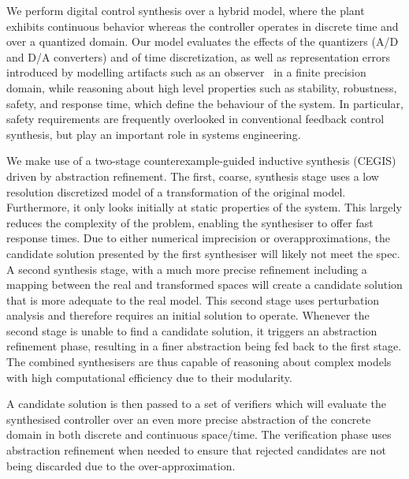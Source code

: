 \documentclass[sigconf]{llncs}
\begin{document}
We perform digital control synthesis over a hybrid model, where the plant
exhibits continuous behavior whereas the controller operates in discrete
time and over a quantized domain.  Our model evaluates the effects of the
quantizers (A/D and D/A converters) and of time discretization, as well as
representation errors introduced by modelling artifacts such as an
observer~\cite{astrom1997computer} in a finite precision domain, while
reasoning about high level properties such as stability, robustness, safety,
and response time, which define the behaviour of the system.  In particular,
safety requirements are frequently overlooked in conventional feedback
control synthesis, but play an important role in systems engineering.


We make use of a two-stage counterexample-guided inductive
synthesis (CEGIS) driven by abstraction refinement.
The first, coarse, synthesis stage uses a low resolution discretized model of a 
transformation of the original model. Furthermore, it only looks initially at
static properties  of the system. This largely reduces the complexity of
the problem, enabling the synthesiser to offer fast response times. %
Due to either numerical imprecision or overapproximations, the
candidate solution presented by the first synthesiser will likely not
meet the spec. A second synthesis stage, with a much more precise
refinement including a mapping between the real and transformed spaces
will create a candidate solution that is more adequate to the real
model. This second stage uses perturbation analysis and therefore
requires an initial solution to operate.  Whenever the second stage is
unable to find a candidate solution, it triggers an abstraction
refinement phase, resulting in a finer abstraction being fed back to
the first stage.  The combined synthesisers are thus capable of
reasoning about complex models with high computational efficiency due
to their modularity.

A candidate solution is then passed to a set of verifiers which will
evaluate the synthesised controller over an even more precise
abstraction of the concrete domain in both discrete and continuous
space/time.  The verification phase uses abstraction refinement when needed to ensure
that rejected candidates are not being discarded due to the
over-approximation.
\end{document}

